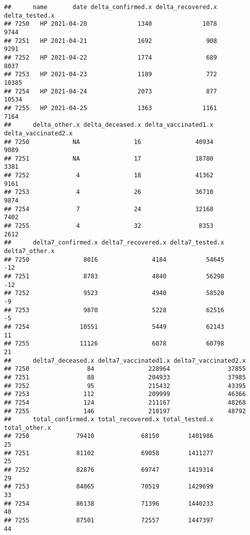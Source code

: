 \documentclass[
]{article}
\begin{document}
\begin{verbatim}
##      name       date delta_confirmed.x delta_recovered.x delta_tested.x
## 7250   HP 2021-04-20              1340              1078           9744
## 7251   HP 2021-04-21              1692               908           9291
## 7252   HP 2021-04-22              1774               689           8037
## 7253   HP 2021-04-23              1189               772          10385
## 7254   HP 2021-04-24              2073               877          10534
## 7255   HP 2021-04-25              1363              1161           7164
##      delta_other.x delta_deceased.x delta_vaccinated1.x delta_vaccinated2.x
## 7250            NA               16               40934                9089
## 7251            NA               17               18780                3381
## 7252             4               18               41362                9161
## 7253             4               26               36710                9874
## 7254             7               24               32168                7402
## 7255             4               32                8353                2612
##      delta7_confirmed.x delta7_recovered.x delta7_tested.x delta7_other.x
## 7250               8016               4184           54645            -12
## 7251               8783               4840           56298            -12
## 7252               9523               4940           58520             -9
## 7253               9870               5228           62516             -5
## 7254              10551               5449           62143             11
## 7255              11126               6078           60798             21
##      delta7_deceased.x delta7_vaccinated1.x delta7_vaccinated2.x
## 7250                84               228964                37855
## 7251                88               204933                37985
## 7252                95               215432                43395
## 7253               112               209999                46366
## 7254               124               211167                48268
## 7255               146               210197                48792
##      total_confirmed.x total_recovered.x total_tested.x total_other.x
## 7250             79410             68150        1401986            25
## 7251             81102             69058        1411277            25
## 7252             82876             69747        1419314            29
## 7253             84065             70519        1429699            33
## 7254             86138             71396        1440233            40
## 7255             87501             72557        1447397            44

\end{verbatim}
\end{document}
